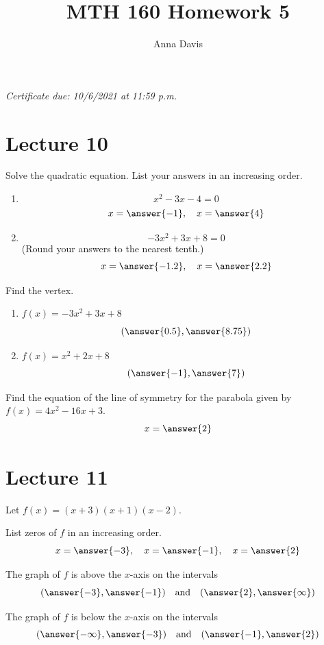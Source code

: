 \documentclass{ximera}
\author{Anna Davis} \title{MTH 160 Homework 5}
\begin{document}
\begin{abstract}

\end{abstract}
\maketitle
 \textit{Certificate due: 10/6/2021 at 11:59 p.m.}
 \section{Lecture 10}
 
  \begin{problem}\label{prob:160hom5prob1} 
  Solve the quadratic equation.  List your answers in an increasing order.
  \begin{enumerate}
      \item $$x^2-3x-4=0$$
      $$x=\answer{-1},\quad x=\answer{4}$$
      \item $$-3x^2+3x+8=0$$ (Round your answers to the nearest tenth.)
      $$x=\answer{-1.2},\quad x=\answer{2.2}$$
  \end{enumerate}
  \end{problem}
  
  \begin{problem}\label{prob:160hom5prob2} 
  Find the vertex.
  \begin{enumerate}
      \item $f(x)=-3x^2+3x+8$
      $$(\answer{0.5},\answer{8.75})$$
      \item $f(x)=x^2+2x+8$
      $$(\answer{-1},\answer{7})$$
  \end{enumerate}
  \end{problem}
  
  \begin{problem}\label{prob:160hom5prob3} 
  Find the equation of the line of symmetry for the parabola given by $f(x)=4x^2-16x+3$.
  $$x=\answer{2}$$
  \end{problem}
  
  \section{Lecture 11}
  
  \begin{problem}\label{prob:160hom5prob5} 
  Let $f(x)=(x+3)(x+1)(x-2)$.  
  
  List zeros of $f$ in an increasing order.
  $$x=\answer{-3},\quad x=\answer{-1},\quad x=\answer{2}$$
  
  The graph of $f$ is above the $x$-axis on the intervals
  $$(\answer{-3},\answer{-1})\quad \mbox{and}\quad (\answer{2},\answer{\infty})$$
  
  The graph of $f$ is below the $x$-axis on the intervals
  $$(\answer{-\infty},\answer{-3})\quad \mbox{and}\quad (\answer{-1},\answer{2})$$
  \end{problem}
  
\end{document}
